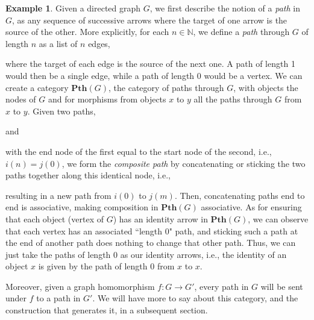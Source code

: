 \documentclass[a4paper]{book}
\theoremstyle{definition}
\newtheorem{example}{Example}[section]
\theoremstyle{definition}
\theoremstyle{definition}
\theoremstyle{theorem}
\theoremstyle{definition}
\begin{document}
\begin{example}
	Given a directed graph $G$, we first describe the notion of a \textit{path} in $G$, as any sequence of successive arrows where the target of one arrow is the source of the other. More explicitly, for each $n \in \mathbb{N}$, we define a \textit{path}  through $G$ of length $n$ as a list of $n$ edges, 
	\begin{center}
	\end{center}
	where the target of each edge is the source of the next one. A path of length 1 would then be a single edge, while a path of length 0 would be a vertex. We can create a category $\textbf{Pth}(G)$, the category of paths through $G$,  with objects the nodes of $G$ and for morphisms from objects $x$ to $y$ all the paths through $G$ from $x$ to $y$. Given two paths, 
	\begin{center}
\end{center}
and 
	\begin{center}
	\end{center} 
with the end node of the first equal to the start node of the second, i.e., $i(n) = j(0)$, we form the \textit{composite path} by concatenating or sticking the two paths together along this identical node, i.e., 
	\begin{center}
\end{center}
resulting in a new path from $i(0)$ to $j(m)$. Then, concatenating paths end to end is associative, making composition in $\textbf{Pth}(G)$ associative. As for ensuring that each object (vertex of $G$) has an identity arrow in $\textbf{Pth}(G)$, we can observe that each vertex has an associated ``length 0" path, and sticking such a path at the end of another path does nothing to change that other path. Thus, we can just take the paths of length 0 as our identity arrows, i.e., the identity of an object $x$ is given by the path of length 0 from $x$ to $x$. \par 
	 Moreover, given a graph homomorphism $f: G \rightarrow G'$, every path in $G$ will be sent under $f$ to a path in $G'$. We will have more to say about this category, and the construction that generates it, in a subsequent section. 
\end{example}
\end{document}
